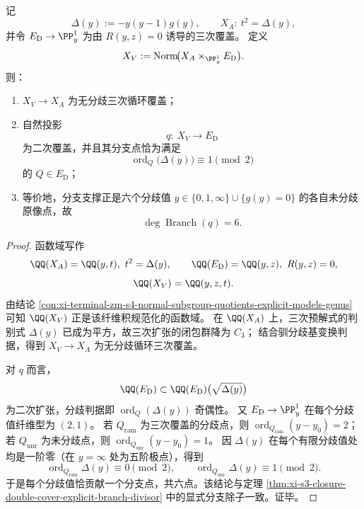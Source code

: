 \begin{theorem}\label{thm:xi-s3-fiberproduct-branch-parity-xa-xv-ed}
记
\[
\Delta(y):=-y(y-1)g(y),\qquad
X_A:\ t^2=\Delta(y),
\]
并令 \(E_{\mathrm D}\to \PP^1_y\) 为由 \(R(y,z)=0\) 诱导的三次覆盖。
定义
\[
X_V:=\operatorname{Norm}\!\bigl(X_A\times_{\PP^1_y}E_{\mathrm D}\bigr).
\]
则：
\begin{enumerate}
  \item \(X_V\to X_A\) 为无分歧三次循环覆盖；
  \item 自然投影
  \[
  q:\ X_V\longrightarrow E_{\mathrm D}
  \]
  为二次覆盖，并且其分支点恰为满足
  \[
  \operatorname{ord}_Q\!\bigl(\Delta(y)\bigr)\equiv 1\pmod 2
  \]
  的 \(Q\in E_{\mathrm D}\)；
  \item 等价地，分支支撑正是六个分歧值
  \(
  y\in\{0,1,\infty\}\cup\{g(y)=0\}
  \)
  的各自未分歧原像点，故
  \[
  \deg \operatorname{Branch}(q)=6.
  \]
\end{enumerate}
\end{theorem}
\begin{proof}
函数域写作
\[
\QQ(X_A)=\QQ(y,t),\ t^2=\Delta(y),\qquad
\QQ(E_{\mathrm D})=\QQ(y,z),\ R(y,z)=0,
\]
\[
\QQ(X_V)=\QQ(y,z,t).
\]
由结论 \ref{con:xi-terminal-zm-s4-normal-subgroup-quotients-explicit-models-genus} 可知
\(\QQ(X_V)\) 正是该纤维积规范化的函数域。
在 \(\QQ(X_A)\) 上，三次预解式的判别式 \(\Delta(y)\) 已成为平方，故三次扩张的闭包群降为 \(C_3\)；
结合驯分歧基变换判据，得到 \(X_V\to X_A\) 为无分歧循环三次覆盖。
\par
对 \(q\) 而言，
\[
\QQ(E_{\mathrm D})\subset \QQ(E_{\mathrm D})\bigl(\sqrt{\Delta(y)}\bigr)
\]
为二次扩张，分歧判据即
\(
\operatorname{ord}_Q(\Delta(y))
\)
奇偶性。
又 \(E_{\mathrm D}\to\PP^1_y\) 在每个分歧值纤维型为 \((2,1)\)。
若 \(Q_{\mathrm{ram}}\) 为三次覆盖的分歧点，则 \(\operatorname{ord}_{Q_{\mathrm{ram}}}(y-y_0)=2\)；
若 \(Q_{\mathrm{unr}}\) 为未分歧点，则 \(\operatorname{ord}_{Q_{\mathrm{unr}}}(y-y_0)=1\)。
因 \(\Delta(y)\) 在每个有限分歧值处均是一阶零（在 \(y=\infty\) 处为五阶极点），得到
\[
\operatorname{ord}_{Q_{\mathrm{ram}}}\Delta(y)\equiv 0\pmod2,\qquad
\operatorname{ord}_{Q_{\mathrm{unr}}}\Delta(y)\equiv 1\pmod2.
\]
于是每个分歧值恰贡献一个分支点，共六点。该结论与定理
\ref{thm:xi-s3-closure-double-cover-explicit-branch-divisor}
中的显式分支除子一致。证毕。
\end{proof}

